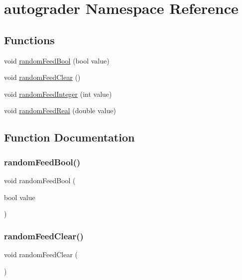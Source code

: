 \hypertarget{namespaceautograder}{}\section{autograder Namespace Reference}
\label{namespaceautograder}
\subsection*{Functions}
\begin{DoxyCompactItemize}
\item 
void \mbox{\hyperlink{namespaceautograder_a9dc13baafecf9d7782bb8fe7e23201ca}{random\+Feed\+Bool}} (bool value)
\item 
void \mbox{\hyperlink{namespaceautograder_a448f8778ed42e2d2939d1732b7bd5748}{random\+Feed\+Clear}} ()
\item 
void \mbox{\hyperlink{namespaceautograder_a4373a6a00739bdae4c357b55efaccabd}{random\+Feed\+Integer}} (int value)
\item 
void \mbox{\hyperlink{namespaceautograder_aa82b490cbbce99abe6b30f854ff8112d}{random\+Feed\+Real}} (double value)
\end{DoxyCompactItemize}


\subsection{Function Documentation}
\mbox{\label{namespaceautograder_a9dc13baafecf9d7782bb8fe7e23201ca}} 
\subsubsection{\texorpdfstring{random\+Feed\+Bool()}{randomFeedBool()}}
{\footnotesize\ttfamily void random\+Feed\+Bool (\begin{DoxyParamCaption}\item[{bool}]{value }\end{DoxyParamCaption})}

\mbox{\label{namespaceautograder_a448f8778ed42e2d2939d1732b7bd5748}} 
\subsubsection{\texorpdfstring{random\+Feed\+Clear()}{randomFeedClear()}}
{\footnotesize\ttfamily void random\+Feed\+Clear (\begin{DoxyParamCaption}{ }\end{DoxyParamCaption})}

